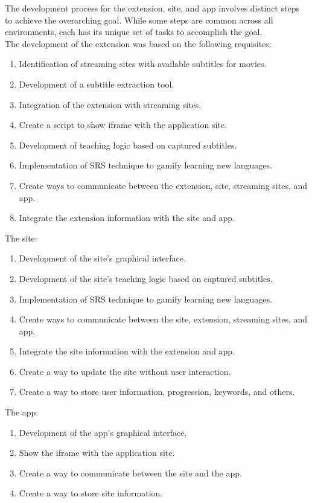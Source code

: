 \documentclass[12pt]{article}
\begin{document}
The development process for the extension, site, and app involves distinct steps to achieve the overarching goal. While some steps are common across all environments, each has its unique set of tasks to accomplish the goal. \\
The development of the extension was based on the following requisites:  
\begin{enumerate}
\item Identification of streaming sites with available subtitles for movies.
\item Development of a subtitle extraction tool.
\item Integration of the extension with streaming sites.
\item Create a script to show iframe with the application site.
\item Development of teaching logic based on captured subtitles.
\item Implementation of SRS technique to gamify learning new languages.
\item Create ways to communicate between the extension, site, streaming sites, and app.
\item Integrate the extension information with the site and app.
\end{enumerate}
The site: 

\begin{enumerate}
\item Development of the site's graphical interface.
\item Development of the site's teaching logic based on captured subtitles.
\item Implementation of SRS technique to gamify learning new languages.
\item Create ways to communicate between the site, extension, streaming sites, and app.
\item Integrate the site information with the extension and app.
\item Create a way to update the site without user interaction.
\item Create a way to store user information, progression, keywords, and others.
\end{enumerate}
The app:

\begin{enumerate}
\item Development of the app's graphical interface.
\item Show the iframe with the application site.
\item Create a way to communicate between the site and the app.
\item Create a way to store site information.
\end{enumerate}
\end{document}
